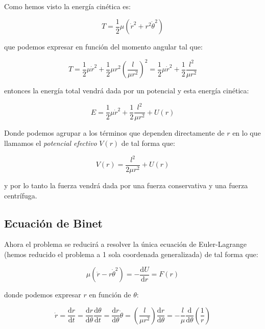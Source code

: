 \documentclass[12pt,a4paper]{book}
\newcommand{\parentesis}[1]{\left( #1  \right)}
\newcommand{\D}{\mathrm{d}}
\begin{document}
Como hemos visto la energía cinética es:

\begin{equation}
T =  \frac{1}{2} \mu (\dot{r}^2 + r^2 \dot{\theta}^2 ) 
\end{equation}

que podemos expresar en función del momento angular tal que:

\begin{equation}
T =  \frac{1}{2} \mu \dot{r}^2 + \dfrac{1}{2} \mu r^2 \parentesis{\dfrac{l}{\mu r^2}}^2  = \frac{1}{2} \mu \dot{r}^2 + \dfrac{1}{2} \dfrac{l^2}{\mu r^2}
\end{equation}

entonces la energía total vendrá dada por un potencial y esta energía cinética:

\begin{equation}
E =  \frac{1}{2} \mu \dot{r}^2 + \dfrac{1}{2} \dfrac{l^2}{\mu r^2} + U(r)
\end{equation}

Donde podemos agrupar a los términos que dependen directamente de $r$ en lo que llamamos el \textit{potencial efectivo} $V(r)$ de tal forma que:

\begin{equation}
V(r) = \dfrac{l^2}{2 \mu r^2} + U(r)
\end{equation}

y por lo tanto la fuerza vendrá dada por una fuerza conservativa y una fuerza centrífuga.

\subsection{Ecuación de Binet}

Ahora el problema se reducirá a resolver la única ecuación de Euler-Lagrange (hemos reducido el problema a 1 sola coordenada generalizada) de tal forma que:

\begin{equation}
\mu (\ddot{r} - r \dot{\theta}^2) = - \dfrac{\D U}{\D r} = F(r)
\end{equation}

donde podemos expresar $r$ en función de $\theta$:

\begin{equation}
\dot{r} = \dfrac{\D r}{\D t} = \dfrac{\D r}{\D \theta} \dfrac{\D \theta}{\D t} = \dfrac{\D r}{\D \theta} \dot{\theta} = \parentesis{\dfrac{l}{ \mu r^2}} \dfrac{\D r}{\D \theta} = - \dfrac{l}{\mu} \dfrac{\D}{\D \theta} \parentesis{\dfrac{1}{r}}
\end{equation}
\end{document}
